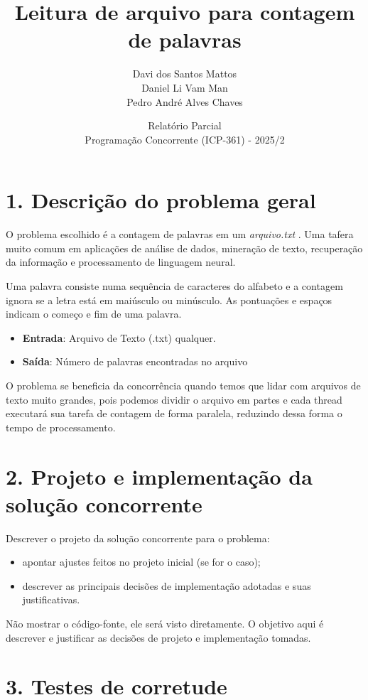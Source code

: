 \documentclass{article}
\title{Leitura de arquivo para contagem de palavras}
\author{Davi dos Santos Mattos \\
        Daniel Li Vam Man \\
        Pedro André Alves Chaves}
\date{Relatório Parcial \\ Programação Concorrente (ICP-361) - 2025/2}
\begin{document}
\maketitle

\section*{1. Descrição do problema geral}

O problema escolhido é a contagem de palavras em um \textit{arquivo.txt} . Uma tafera muito comum em aplicações de análise de dados, mineração de texto, recuperação da informação e processamento de linguagem neural.

Uma palavra consiste numa sequência de caracteres do alfabeto e a contagem ignora se a letra está em maiúsculo ou minúsculo. As pontuações e espaços indicam o começo e fim de uma palavra.
\begin{itemize}
    \item \textbf{Entrada}: Arquivo de Texto (.txt) qualquer.
    \item \textbf{Saída}: Número de palavras encontradas no arquivo
\end{itemize}

O problema se beneficia da concorrência quando temos que lidar com arquivos de texto muito grandes, pois podemos dividir o arquivo em partes e cada thread executará sua tarefa de contagem de forma paralela, reduzindo dessa forma o tempo de processamento.
    


\section*{2. Projeto e implementação da solução concorrente}

Descrever o projeto da solução concorrente para o problema:

\begin{itemize}
    \item apontar ajustes feitos no projeto inicial (se for o caso);
    \item descrever as principais decisões de implementação adotadas e suas justificativas.
\end{itemize}

Não mostrar o código-fonte, ele será visto diretamente. O objetivo aqui é descrever
e justificar as decisões de projeto e implementação tomadas.

\section*{3. Testes de corretude}
\end{document}
